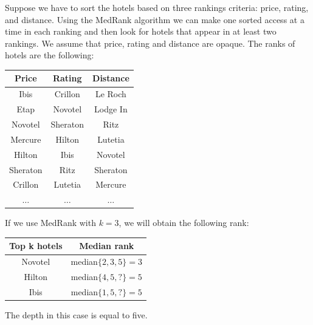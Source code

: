 \documentclass[12pt, a4paper]{report}
\begin{document}
    \begin{example}
        Suppose we have to sort the hotels based on three rankings criteria: price, rating, and distance. Using the MedRank algorithm we can make one sorted access at a time in 
        each ranking and then look for hotels that appear in at least two rankings. We assume that price, rating and distance are opaque. The 
        ranks of hotels are the following:
        \begin{table}[H]
            \centering
            \begin{tabular}{c|c|c}
            \textbf{Price} & \textbf{Rating} & \textbf{Distance} \\ \hline
            Ibis           & Crillon         & Le Roch           \\
            Etap           & Novotel         & Lodge In          \\
            Novotel        & Sheraton        & Ritz              \\
            Mercure        & Hilton          & Lutetia           \\
            Hilton         & Ibis            & Novotel           \\
            Sheraton       & Ritz            & Sheraton          \\
            Crillon        & Lutetia         & Mercure           \\
            $\dots$        & $\dots$         & $\dots$          
            \end{tabular}
        \end{table}
        If we use MedRank with $k=3$, we will obtain the following rank: 
        \begin{table}[H]
            \centering
            \begin{tabular}{cc}
            \hline
            \textbf{Top k hotels}       & \textbf{Median rank}          \\ \hline
            Novotel                     & median$\{2,3,5\}=3$           \\ 
            Hilton                      & median$\{4,5,?\}=5$           \\ 
            Ibis                        & median$\{1,5,?\}=5$           \\ \hline
            \end{tabular}
        \end{table}
        The depth in this case is equal to five. 
    \end{example}
\end{document}
